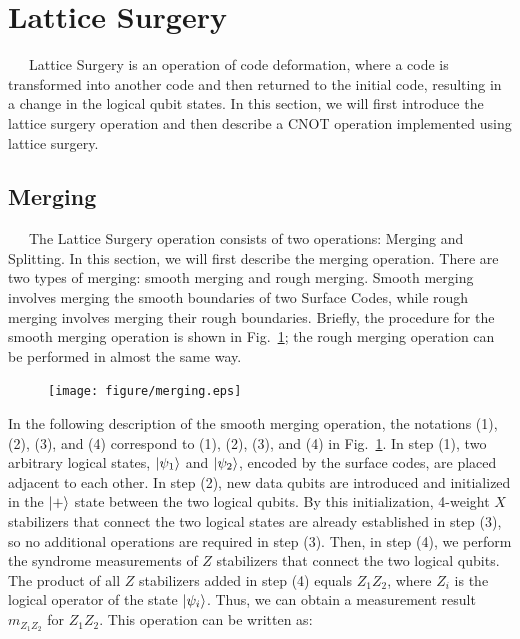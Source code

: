 \documentclass[a4paper,11pt]{ltjsarticle}
\begin{document}
\section{Lattice Surgery}{
    \ \ \ Lattice Surgery \cite{horsman2012} is an operation of code deformation, where a code is transformed into another code and then returned to the initial code, resulting in a change in the logical qubit states. In this section, we will first introduce the lattice surgery operation and then describe a CNOT operation implemented using lattice surgery.

    \subsection{Merging}
    \ \ \ The Lattice Surgery operation consists of two operations: Merging and Splitting. In this section, we will first describe the merging operation. There are two types of merging: smooth merging and rough merging. Smooth merging involves merging the smooth boundaries of two Surface Codes, while rough merging involves merging their rough boundaries. Briefly, the procedure for the smooth merging operation is shown in Fig.~\ref{merging}; the rough merging operation can be performed in almost the same way.

    \begin{figure}[h]
        \centering
        \texttt{[image: figure/merging.eps]}
        \vspace{0pt}\caption{}
        \label{merging}
        \vspace{-10pt}
    \end{figure}

    In the following description of the smooth merging operation, the notations (1), (2), (3), and (4) correspond to (1), (2), (3), and (4) in Fig.~\ref{merging}. In step (1), two arbitrary logical states, $\ket{\psi_1}$ and $\ket{\psi_2}$, encoded by the surface codes, are placed adjacent to each other. In step (2), new data qubits are introduced and initialized in the $\ket{+}$ state between the two logical qubits. By this initialization, 4-weight $X$ stabilizers that connect the two logical states are already established in step (3), so no additional operations are required in step (3). Then, in step (4), we perform the syndrome measurements of $Z$ stabilizers that connect the two logical qubits. The product of all $Z$ stabilizers added in step (4) equals $Z_1Z_2$, where $Z_i$ is the logical operator of the state $\ket{\psi_i}$. Thus, we can obtain a measurement result $m_{Z_1Z_2}$ for $Z_1Z_2$. This operation can be written as:

}
\end{document}
